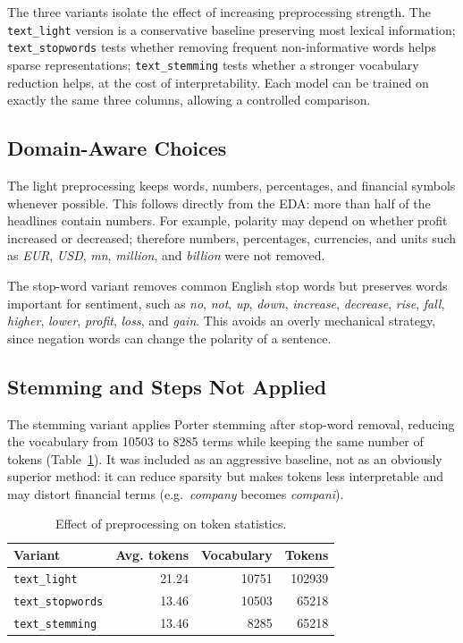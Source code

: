 \documentclass[sigconf,nonacm]{acmart}
\begin{document}
The three variants isolate the effect of increasing preprocessing strength. The \texttt{text\_light} version is a conservative baseline preserving most lexical information; \texttt{text\_stopwords} tests whether removing frequent non-informative words helps sparse representations; \texttt{text\_stemming} tests whether a stronger vocabulary reduction helps, at the cost of interpretability. Each model can be trained on exactly the same three columns, allowing a controlled comparison.

\subsection{Domain-Aware Choices}

The light preprocessing keeps words, numbers, percentages, and financial symbols whenever possible. This follows directly from the EDA: more than half of the headlines contain numbers. For example, polarity may depend on whether profit increased or decreased; therefore numbers, percentages, currencies, and units such as \textit{EUR}, \textit{USD}, \textit{mn}, \textit{million}, and \textit{billion} were not removed.

The stop-word variant removes common English stop words but preserves words important for sentiment, such as \textit{no}, \textit{not}, \textit{up}, \textit{down}, \textit{increase}, \textit{decrease}, \textit{rise}, \textit{fall}, \textit{higher}, \textit{lower}, \textit{profit}, \textit{loss}, and \textit{gain}. This avoids an overly mechanical strategy, since negation words can change the polarity of a sentence.

\subsection{Stemming and Steps Not Applied}

The stemming variant applies Porter stemming after stop-word removal, reducing the vocabulary from 10503 to 8285 terms while keeping the same number of tokens (Table~\ref{tab:prep-stats}). It was included as an aggressive baseline, not as an obviously superior method: it can reduce sparsity but makes tokens less interpretable and may distort financial terms (e.g.\ \textit{company} becomes \textit{compani}).

\begin{table}[t]
\centering
\caption{Effect of preprocessing on token statistics.}
\label{tab:prep-stats}
\begin{tabular}{lrrr}
\toprule
Variant & Avg. tokens & Vocabulary & Tokens \\
\midrule
\texttt{text\_light} & 21.24 & 10751 & 102939 \\
\texttt{text\_stopwords} & 13.46 & 10503 & 65218 \\
\texttt{text\_stemming} & 13.46 & 8285 & 65218 \\
\bottomrule
\end{tabular}
\end{table}
\end{document}
